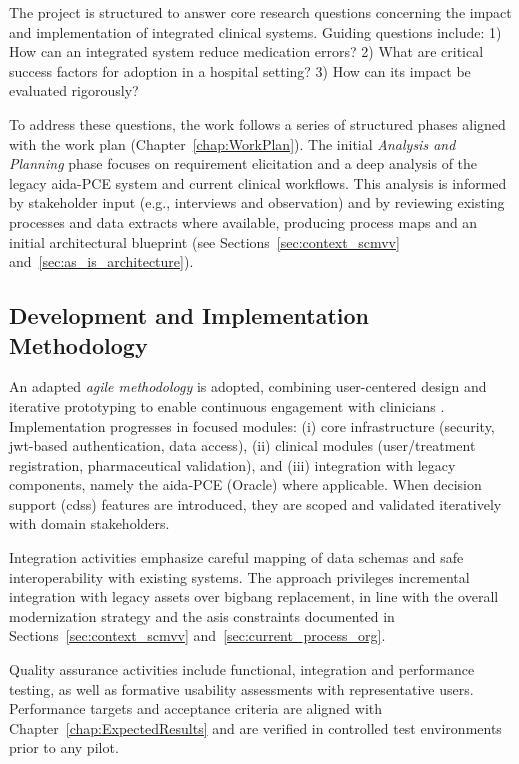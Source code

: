 The project is structured to answer core research questions concerning the impact and implementation of integrated clinical systems. Guiding questions include: 1) How can an integrated system reduce medication errors? 2) What are critical success factors for adoption in a hospital setting? 3) How can its impact be evaluated rigorously?

To address these questions, the work follows a series of structured phases aligned with the work plan (Chapter~\ref{chap:WorkPlan}). The initial \textit{Analysis and Planning} phase focuses on requirement elicitation and a deep analysis of the legacy \gls{aida}-PCE system and current clinical workflows. This analysis is informed by stakeholder input (e.g., interviews and observation) and by reviewing existing processes and data extracts where available, producing process maps and an initial architectural blueprint (see Sections~\ref{sec:context_scmvv} and~\ref{sec:as_is_architecture}).

\subsection{Development and Implementation Methodology}

An adapted \textit{agile methodology} is adopted, combining user-centered design and iterative prototyping to enable continuous engagement with clinicians \cite{fowler2018}. Implementation progresses in focused modules: (i) core infrastructure (security, \gls{jwt}-based authentication, data access), (ii) clinical modules (user/treatment registration, pharmaceutical validation), and (iii) integration with legacy components, namely the \gls{aida}-PCE (Oracle) where applicable. When decision support (\gls{cdss}) features are introduced, they are scoped and validated iteratively with domain stakeholders.

Integration activities emphasize careful mapping of data schemas and safe interoperability with existing systems. The approach privileges incremental integration with legacy assets over big\-bang replacement, in line with the overall modernization strategy and the as\-is constraints documented in Sections~\ref{sec:context_scmvv} and~\ref{sec:current_process_org}.

Quality assurance activities include functional, integration and performance testing, as well as formative usability assessments with representative users. Performance targets and acceptance criteria are aligned with Chapter~\ref{chap:ExpectedResults} and are verified in controlled test environments prior to any pilot.

